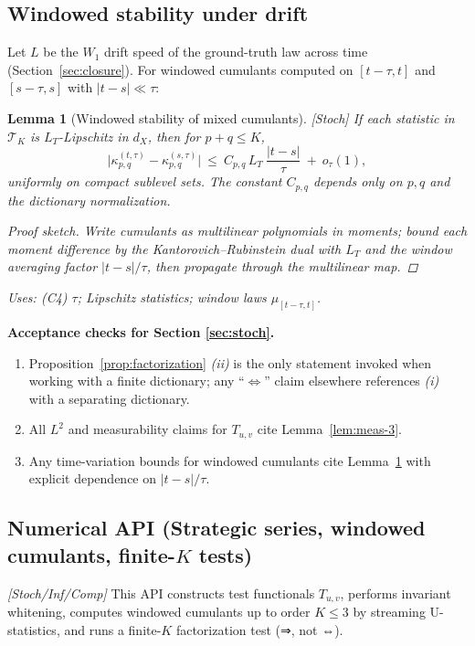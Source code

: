 \documentclass[10pt]{article}
\newcommand{\uses}[1]{\par\smallskip\noindent\textit{Uses: }#1\par\smallskip}
\newenvironment{proofsketch}{\begin{proof}[Proof sketch]}{\end{proof}}
\newcommand{\layertag}[1]{\textup{[#1]}}
\newtheorem{lemma}{Lemma}
\begin{document}
\subsection{Windowed stability under drift}\label{subsec:window-stability}

Let $L$ be the $W_1$ drift speed of the ground-truth law across time (Section~\ref{sec:closure}). For windowed cumulants computed on $[t-\tau,t]$ and $[s-\tau,s]$ with $|t-s|\ll \tau$:

\begin{lemma}[Windowed stability of mixed cumulants]\label{lem:window-stability}
\emph{[\textup{Stoch}]}
If each statistic in $\mathcal T_K$ is $L_T$-Lipschitz in $d_X$, then for $p+q\le K$,
\[
\Big|\kappa_{p,q}^{(t,\tau)}-\kappa_{p,q}^{(s,\tau)}\Big|
\ \le\ C_{p,q}\,L_T\ \frac{|t-s|}{\tau}\ +\ o_\tau(1),
\]
uniformly on compact sublevel sets. The constant $C_{p,q}$ depends only on $p,q$ and the dictionary normalization.
\begin{proofsketch}
Write cumulants as multilinear polynomials in moments; bound each moment difference by the Kantorovich–Rubinstein dual with $L_T$ and the window averaging factor $|t-s|/\tau$, then propagate through the multilinear map.
\end{proofsketch}
\uses{(C4) $\tau$; Lipschitz statistics; window laws $\mu_{[t-\tau,t]}$.}
\end{lemma}

\begin{mdframed}
\textbf{Acceptance checks for Section \ref{sec:stoch}.}
\begin{enumerate}[leftmargin=*]
\item Proposition~\ref{prop:factorization} \emph{(ii)} is the only statement invoked when working with a finite dictionary; any “$\Leftrightarrow$” claim elsewhere references \emph{(i)} with a separating dictionary.
\item All $L^2$ and measurability claims for $T_{u,v}$ cite Lemma~\ref{lem:meas-3}.
\item Any time-variation bounds for windowed cumulants cite Lemma~\ref{lem:window-stability} with explicit dependence on $|t-s|/\tau$.
\end{enumerate}
\end{mdframed}

\subsection*{Numerical API (Strategic series, windowed cumulants, finite-\texorpdfstring{$K$}{K} tests)}
\emph{\layertag{Stoch/Inf/Comp}} This API constructs test functionals $T_{u,v}$, performs invariant whitening, computes windowed cumulants up to order $K\le 3$ by streaming U-statistics, and runs a finite-$K$ factorization test (⇒, not ⇔).
\end{document}
